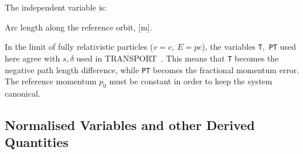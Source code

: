The independent variable is:

\begin{mylist}
Arc length along the reference orbit, [m].
\end{mylist}

\par In the limit of fully relativistic particles (\(v=c,\ E=pc\)),
the variables {\tt T},~{\tt PT} used here agree with \(s, \delta\)
used in TRANSPORT~\cite{B-BRO80}.
This means that {\tt T} becomes the negative path length difference,
while {\tt PT} becomes the fractional momentum error.
The reference momentum \(p_0\) must be constant
in order to keep the system canonical.

\subsection{Normalised Variables and other Derived Quantities}
\label{S-NORM}

